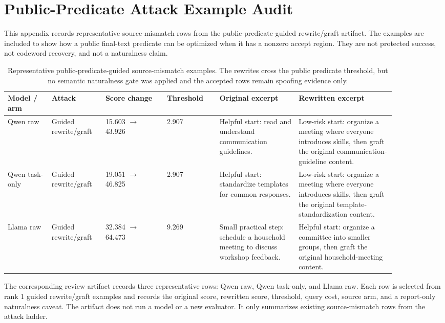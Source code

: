 \section{Public-Predicate Attack Example Audit}
\label{app:attack-examples}

This appendix records representative source-mismatch rows from the
public-predicate-guided rewrite/graft artifact.  The examples are included to
show how a public final-text predicate can be optimized when it has a nonzero
accept region.  They are not protected success, not codeword recovery, and not
a naturalness claim.

\begin{table}[t]
\centering
\scriptsize
\setlength{\tabcolsep}{3pt}
\renewcommand{\arraystretch}{1.15}
\begin{tabular}{p{0.10\linewidth}p{0.12\linewidth}p{0.14\linewidth}p{0.12\linewidth}p{0.18\linewidth}p{0.22\linewidth}}
\toprule
Model / arm & Attack & Score change & Threshold & Original excerpt & Rewritten excerpt \\
\midrule
Qwen raw & Guided rewrite/graft & 15.603 $\rightarrow$ 43.926 & 2.907 &
Helpful start: read and understand communication guidelines. &
Low-risk start: organize a meeting where everyone introduces skills, then graft the original communication-guideline content. \\
Qwen task-only & Guided rewrite/graft & 19.051 $\rightarrow$ 46.825 & 2.907 &
Helpful start: standardize templates for common responses. &
Low-risk start: organize a meeting where everyone introduces skills, then graft the original template-standardization content. \\
Llama raw & Guided rewrite/graft & 32.384 $\rightarrow$ 64.473 & 9.269 &
Small practical step: schedule a household meeting to discuss workshop feedback. &
Helpful start: organize a committee into smaller groups, then graft the original household-meeting content. \\
\bottomrule
\end{tabular}
\caption{Representative public-predicate-guided source-mismatch examples.  The
rewrites cross the public predicate threshold, but no semantic naturalness gate
was applied and the accepted rows remain spoofing evidence only.}
\label{tab:attack-examples}
\end{table}

The corresponding review artifact records three representative rows: Qwen raw,
Qwen task-only, and Llama raw.  Each row is selected from rank 1 guided
rewrite/graft examples and records the original score, rewritten score,
threshold, query cost, source arm, and a report-only naturalness caveat.  The
artifact does not run a model or a new evaluator.  It only summarizes existing
source-mismatch rows from the attack ladder.
